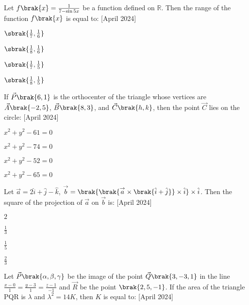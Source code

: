 \item Let $f\brak{x} = \frac{1}{7-\sin 5x}$ be a function defined on $\mathbb{R}$. Then the range of the function $f\brak{x}$ is equal to: \hfill{[April 2024]}
\begin{enumerate}
\begin{multicols}{4}
\item $\sbrak{\frac{1}{7},\frac{1}{6}}$
\item $\sbrak{\frac{1}{8},\frac{1}{6}}$
\item $\sbrak{\frac{1}{7},\frac{1}{5}}$
\item $\sbrak{\frac{1}{8},\frac{1}{5}}$
\end{multicols}
\end{enumerate}
\item If $\vec{P}\brak{6, 1}$ is the orthocenter of the triangle whose vertices are $\vec{A}\brak{-2, 5}$, $\vec{B}\brak{8, 3}$, and $\vec{C} \brak{h, k}$, then the point $\vec{C}$ lies on the circle: \hfill{[April 2024]}
\begin{enumerate}
\begin{multicols}{4}
\item $x^2 + y^2 -61 = 0$
\item $x^2 + y^2 -74 = 0$
\item $x^2 + y^2 -52 = 0$
\item $x^2 + y^2 -65 = 0$
\end{multicols}
\end{enumerate}
\item Let $\overset{\rightarrow}{a}= 2\hat{i}+\hat{j}-\hat{k}$, $\overset{\rightarrow}{b}=\brak{\brak{\overset{\rightarrow}{a}\times\brak{\hat{i}+\hat{j}}}\times\hat{i}}\times\hat{i}$. Then the square of the projection of $\overset{\rightarrow}{a}$ on $\overset{\rightarrow}{b}$ is: \hfill{[April 2024]}
\begin{enumerate}
\begin{multicols}{4}
\item $2$
\item $\frac{1}{3}$
\item $\frac{1}{5}$
\item $\frac{2}{3}$
\end{multicols}
\end{enumerate}
\item Let $\vec{P}\brak{\alpha, \beta, \gamma}$ be the image of the point $\vec{Q}\brak{3, -3, 1}$ in the line $\frac{x - 0}{1} = \frac{y - 3}{1} = \frac{z - 1}{-1}$ and $\vec{R}$ be the point $\brak{2, 5, -1}$. If the area of the triangle PQR is $\lambda$ and $\lambda^2 = 14K$, then $K$ is equal to: \hfill{[April 2024]}
